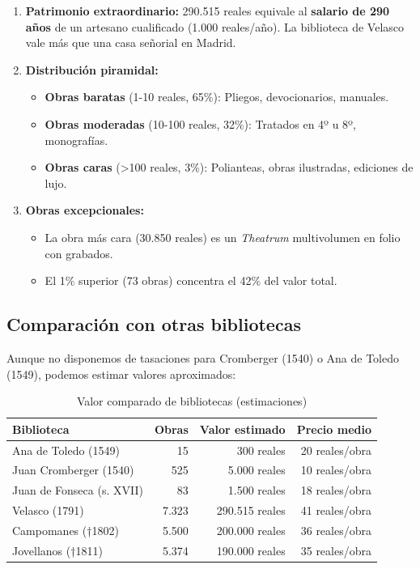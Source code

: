 \documentclass[12pt,a4paper]{article}
\begin{document}
\begin{enumerate}
\item \textbf{Patrimonio extraordinario:} 290.515 reales equivale al \textbf{salario de 290 años} de un artesano cualificado (1.000 reales/año). La biblioteca de Velasco vale más que una casa señorial en Madrid.

\item \textbf{Distribución piramidal:}
\begin{itemize}
\item \textbf{Obras baratas} (1-10 reales, 65\%): Pliegos, devocionarios, manuales.
\item \textbf{Obras moderadas} (10-100 reales, 32\%): Tratados en 4º u 8º, monografías.
\item \textbf{Obras caras} (>100 reales, 3\%): Polianteas, obras ilustradas, ediciones de lujo.
\end{itemize}

\item \textbf{Obras excepcionales:}
\begin{itemize}
\item La obra más cara (30.850 reales) es un \textit{Theatrum} multivolumen en folio con grabados.
\item El 1\% superior (73 obras) concentra el 42\% del valor total.
\end{itemize}
\end{enumerate}

\subsection{Comparación con otras bibliotecas}

Aunque no disponemos de tasaciones para Cromberger (1540) o Ana de Toledo (1549), podemos estimar valores aproximados:

\begin{table}[h]
\centering
\begin{tabular}{lrrr}
\toprule
\textbf{Biblioteca} & \textbf{Obras} & \textbf{Valor estimado} & \textbf{Precio medio} \\
\midrule
Ana de Toledo (1549) & 15 & 300 reales & 20 reales/obra \\
Juan Cromberger (1540) & 525 & 5.000 reales & 10 reales/obra \\
Juan de Fonseca (s. XVII) & 83 & 1.500 reales & 18 reales/obra \\
Velasco (1791) & 7.323 & 290.515 reales & 41 reales/obra \\
Campomanes (†1802) & 5.500 & 200.000 reales & 36 reales/obra \\
Jovellanos (†1811) & 5.374 & 190.000 reales & 35 reales/obra \\
\bottomrule
\end{tabular}
\caption{Valor comparado de bibliotecas (estimaciones)}
\end{table}
\end{document}
